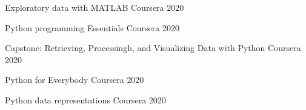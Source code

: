 \begin{cvhonors}
\cvhonor
{Exploratory data with MATLAB} %
{} %
{Coursera} %
{2020} %

\cvhonor
{Python programming Essentials} %
{} %
{Coursera} %
{2020} %

\cvhonor
{Capstone: Retrieving, Processingh, and Visualizing Data with Python} %
{} %
{Coursera} %
{2020} %

\cvhonor
{Python for Everybody} %
{} %
{Coursera} %
{2020} %

\cvhonor
{Python data representations} %
{} %
{Coursera} %
{2020} %

\end{cvhonors}


